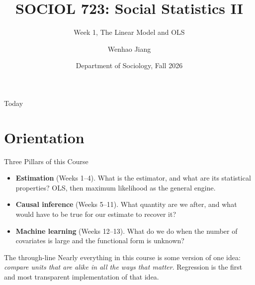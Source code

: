 \documentclass[aspectratio=169,11pt,xcolor=dvipsnames]{beamer}
\title[SOCIOL 723]{SOCIOL 723: Social Statistics II\\[2pt]}
\subtitle{\large Week 1, The Linear Model and OLS\\[-8pt]}
\author[Jiang]{\large Wenhao Jiang\vspace{-1.5em}}
\institute[Duke]{}
\date{\large Department of Sociology, Fall 2026}
\begin{document}
\begin{frame}[plain]
  \titlepage
\end{frame}

\begin{frame}{Today}
  \tableofcontents
\end{frame}

\section[Orientation]{Orientation}
\begin{frame}\sectionpage\end{frame}

\begin{frame}{Three Pillars of this Course}
\begin{itemize}\itemsep6pt
  \item \textbf{Estimation} (Weeks 1--4). What is the estimator, and what are its
        statistical properties? OLS, then maximum likelihood as the general engine.
  \item \textbf{Causal inference} (Weeks 5--11). What quantity are we after, and
        what would have to be true for our estimate to recover it?
  \item \textbf{Machine learning} (Weeks 12--13). What do we do when the number of
        covariates is large and the functional form is unknown?
\end{itemize}
\vskip8pt
\begin{block}{The through-line}
Nearly everything in this course is some version of one idea:
\emph{compare units that are alike in all the ways that matter}. Regression is the
first and most transparent implementation of that idea.
\end{block}
\end{frame}
\end{document}

